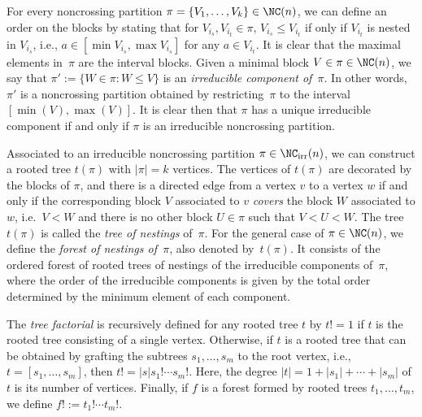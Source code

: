 For every noncrossing partition $\pi = \{V_1,\dots,V_k\}\in \NC(n)$, we can define an order on the blocks by stating that for $V_{i_s},V_{i_t} \in \pi$, $V_{i_s}\leq V_{i_t}$ if only if $V_{i_t}$ is nested in $V_{i_s}$, i.e., $a \in [\min{V_{i_s}},\max{V_{i_s}}]$ for any $a \in V_{i_t}$. It is clear that the maximal elements in~$\pi$ are the interval blocks.
Given a minimal block $V\in \pi\in \NC(n)$, we say that $\pi':=\{ W\in \pi\colon W\leq V\}$ is an \textit{irreducible component of~$\pi$}. In other words, $\pi'$ is a noncrossing partition obtained by restricting~$\pi$ to the interval $[\min(V),\max(V)]$. It is clear then that $\pi$ has a unique irreducible component if and only if $\pi$ is an irreducible noncrossing partition.

Associated to an irreducible noncrossing partition $\pi\in \NC_{\mathrm{irr}}(n)$, we can construct a rooted tree $t(\pi)$ with $|\pi| = k$ vertices. The vertices of $t(\pi)$ are decorated by the blocks of $\pi$, and there is a directed edge from a vertex $v$ to a vertex $w$ if and only if the corresponding block $V$ associated to $v$ \textit{covers} the block $W$ associated to $w$, i.e.~$V<W$ and there is no other block $U\in \pi$ such that $V<U<W$. The tree $t(\pi)$ is called the \textit{tree of nestings} of~$\pi$. For the general case of $\pi \in \NC(n)$, we define the \textit{forest of nestings of~$\pi$}, also denoted by~$t(\pi)$. It consists of the ordered forest of rooted trees of nestings of the irreducible components of~$\pi$, where the order of the irreducible components is given by the total order determined by the minimum element of each component.

The \emph{tree factorial} is recursively defined for any rooted tree $t$ by $t! = 1$ if $t$ is the rooted tree consisting of a single vertex. Otherwise, if $t$ is a rooted tree that can be obtained by grafting the subtrees $s_1,\dots,s_m$ to the root vertex, i.e., $t=[s_1,\dots,s_m]$, then
$t! = |s| s_1!\cdots s_m!$.
Here, the degree $|t|=1+|s_1| + \cdots + |s_m|$ of $t$ is its number of vertices. Finally, if $f$ is a forest formed by rooted trees $t_1,\dots,t_m$, we define $f! := t_1!\cdots t_m!$.

